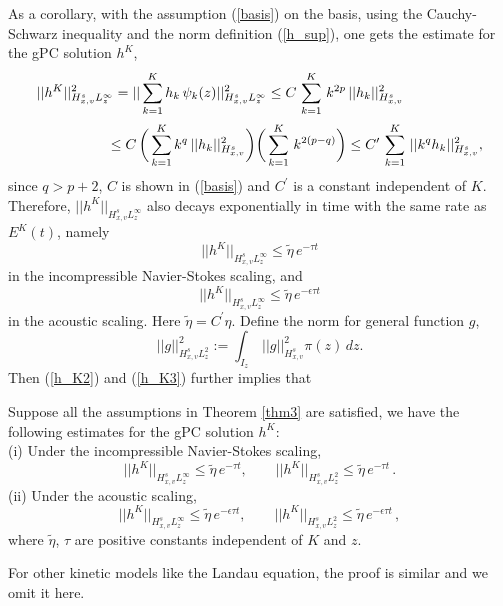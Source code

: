 \documentclass[final,onefignum,onetabnum]{siamart171218}
\begin{document}
As a corollary, with the assumption (\ref{basis}) on the basis, using the Cauchy-Schwarz inequality and the norm definition (\ref{h_sup}), 
one gets the estimate for the gPC solution $h^K$, 
\begin{align}
&\displaystyle ||h^K||_{H_{x,v}^s L_z^{\infty}}^2 = ||\sum_{k=1}^{K} h_k\, \psi_k(z)||_{H_{x,v}^s L_z^{\infty}}^2
\leq C\, \sum_{k=1}^{K}\, k^{2p}\, ||h_k||_{H_{x,v}^s}^2 \notag\\[2pt]
&\label{h_K1}\displaystyle\qquad\qquad\quad\leq C\, \bigg(\sum_{k=1}^{K} k^{q}\, ||h_k||_{H_{x,v}^s}^2\bigg)\bigg(\sum_{k=1}^{K}\, k^{2(p-q)}\bigg)
\leq C^{\prime}\,\sum_{k=1}^{K}\, ||k^q h_k||_{H_{x,v}^s}^2,
\end{align}
since $q>p+2$, $C$ is shown in (\ref{basis}) and $C^{\prime}$ is a constant independent of $K$.
Therefore, $\displaystyle||h^K||_{H_{x,v}^s L_z^{\infty}}$ also decays exponentially in time with the same rate as $E^K(t)$, namely
\begin{equation}\label{h_K2}||h^K||_{H^s_{x,v}L_z^{\infty}} \leq \tilde\eta\, e^{-\tau t}
\end{equation}
in the incompressible Navier-Stokes scaling, and
\begin{equation}\label{h_K3} ||h^K||_{H^s_{x,v}L_z^{\infty}} \leq \tilde\eta\, e^{-\epsilon\tau t} 
\end{equation} in the acoustic scaling. Here $\tilde\eta = C^{\prime}\eta$. 
Define the norm for general function $g$, 
\begin{equation}\label{h_e} ||g||_{H_{x,v}^{s} L_z^2}^2 := \int_{I_z}\, ||g||_{H_{x,v}^s}^2 \pi(z)\, dz. 
\end{equation}
Then (\ref{h_K2}) and (\ref{h_K3}) further implies that 
\begin{corollary}
\label{Col}
Suppose all the assumptions in Theorem \ref{thm3} are satisfied, we have the following estimates for the gPC solution $h^K$: \\
(i) Under the incompressible Navier-Stokes scaling, 
\begin{equation*}
||h^K||_{H^s_{x,v}L_z^{\infty}} \leq \tilde\eta\, e^{-\tau t}, \qquad ||h^K||_{H^s_{x,v}L_z^2} \leq \tilde\eta\, e^{-\tau t}\,.  
\end{equation*}
(ii) Under the acoustic scaling, 
\begin{equation*}
||h^K||_{H^s_{x,v}L_z^{\infty}} \leq \tilde\eta\, e^{-\epsilon\tau t}, \qquad ||h^K||_{H^s_{x,v}L_z^2} \leq \tilde\eta\,  e^{-\epsilon\tau t}\,,  
\end{equation*}
where $\tilde\eta$, $\tau$ are positive constants independent of $K$ and $z$. 
\end{corollary}
For other kinetic models like the Landau equation, the proof is similar and we omit it here.
\end{document}
